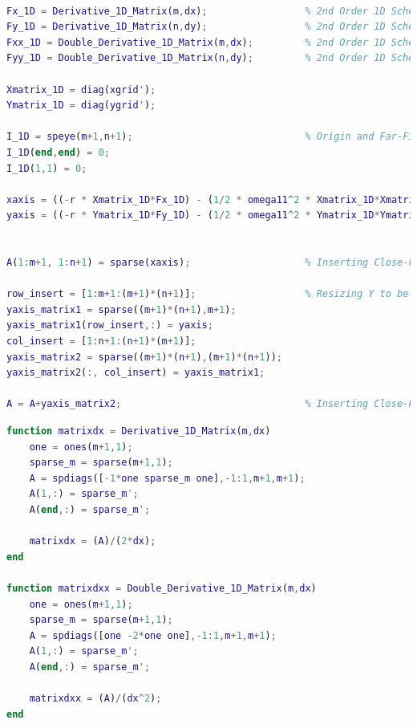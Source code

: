 \documentclass[12pt,letterpaper]{article}
\begin{document}
\begin{lstlisting}[language = Matlab]
%% Encorporating Close-Field Boundary Conditions into A

Fx_1D = Derivative_1D_Matrix(m,dx);                 % 2nd Order 1D Scheme for First Derivative with Respect to X
Fy_1D = Derivative_1D_Matrix(n,dy);                 % 2nd Order 1D Scheme for First Derivative with Respect to Y
Fxx_1D = Double_Derivative_1D_Matrix(m,dx);         % 2nd Order 1D Scheme for Second Derivative with Respect to X
Fyy_1D = Double_Derivative_1D_Matrix(n,dy);         % 2nd Order 1D Scheme for Second Derivative with Respect to Y

Xmatrix_1D = diag(xgrid');
Ymatrix_1D = diag(ygrid');

I_1D = speye(m+1,n+1);                              % Origin and Far-Field Boundary Conditions Are Later Addressed
I_1D(end,end) = 0;
I_1D(1,1) = 0;

xaxis = ((-r * Xmatrix_1D*Fx_1D) - (1/2 * omega11^2 * Xmatrix_1D*Xmatrix_1D * Fxx_1D) + r*I_1D);
yaxis = ((-r * Ymatrix_1D*Fy_1D) - (1/2 * omega11^2 * Ymatrix_1D*Ymatrix_1D * Fyy_1D) + r*I_1D);


A(1:m+1, 1:n+1) = sparse(xaxis);                    % Inserting Close-Field Boundary Condition for X-Axis into A

row_insert = [1:m+1:(m+1)*(n+1)];                   % Resizing Y to be Inserted Into A Matrix
yaxis_matrix1 = sparse((m+1)*(n+1),m+1);
yaxis_matrix1(row_insert,:) = yaxis;
col_insert = [1:n+1:(n+1)*(m+1)];
yaxis_matrix2 = sparse((m+1)*(n+1),(m+1)*(n+1));
yaxis_matrix2(:, col_insert) = yaxis_matrix1;

A = A+yaxis_matrix2;                                % Inserting Close-Field Boundary Condition for Y-Axis into A
\end{lstlisting}

\begin{lstlisting}[language = Matlab]
function matrixdx = Derivative_1D_Matrix(m,dx)
    one = ones(m+1,1);
    sparse_m = sparse(m+1,1);
    A = spdiags([-1*one sparse_m one],-1:1,m+1,m+1);
    A(1,:) = sparse_m';
    A(end,:) = sparse_m';
 
    matrixdx = (A)/(2*dx);
end

function matrixdxx = Double_Derivative_1D_Matrix(m,dx)
    one = ones(m+1,1);
    sparse_m = sparse(m+1,1);
    A = spdiags([one -2*one one],-1:1,m+1,m+1);
    A(1,:) = sparse_m';
    A(end,:) = sparse_m';

    matrixdxx = (A)/(dx^2);
end
\end{lstlisting}
\end{document}
